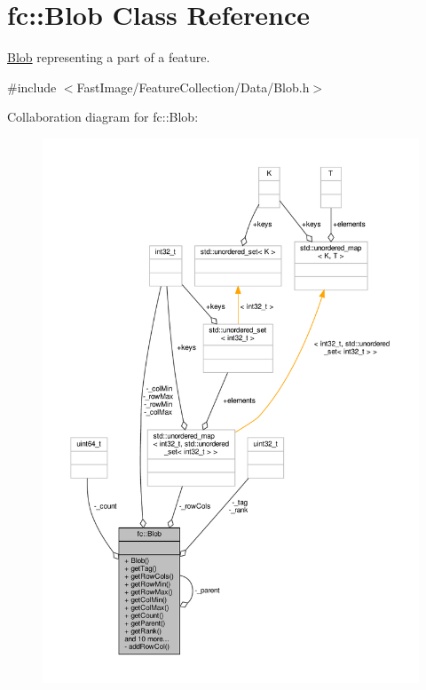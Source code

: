 \hypertarget{classfc_1_1Blob}{}\section{fc\+:\+:Blob Class Reference}
\label{classfc_1_1Blob}


\hyperlink{classfc_1_1Blob}{Blob} representing a part of a feature.  




{\ttfamily \#include $<$Fast\+Image/\+Feature\+Collection/\+Data/\+Blob.\+h$>$}



Collaboration diagram for fc\+:\+:Blob\+:
\nopagebreak
\begin{figure}[H]
\begin{center}
\leavevmode
\includegraphics[width=350pt]{d9/d0a/classfc_1_1Blob__coll__graph}
\end{center}
\end{figure}
